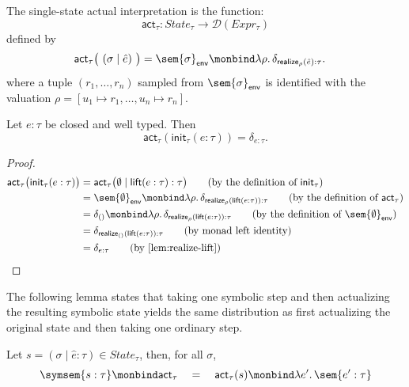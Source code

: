 \begin{definition}
  The single-state actual interpretation is the function:
  \[
    \mathsf{act}_\tau : State_\tau \to \mathcal{D}(Expr_\tau)
  \]
  defined by
  \[
  \begin{aligned}
    \mathsf{act}_\tau\big(\ (\sigma \mid \hat e)\ \big)
    &=
    \sem{\sigma}_{\mathsf{env}}
    \monbind
    \lambda\rho.\,
    \delta_{\mathsf{realize}_\rho(\hat e) : \tau}.
  \end{aligned}
  \]
  where a tuple $(r_1,\ldots,r_n)$ sampled from
  $\sem{\sigma}_{\mathsf{env}}$ is identified with the valuation
  $\rho=[u_1\mapsto r_1,\ldots,u_n\mapsto r_n]$.
\end{definition}


\begin{lemma}
  Let $e:\tau$ be closed and well typed. Then
  \[
    \mathsf{act}_\tau
    (\mathsf{init}_\tau(e : \tau))
    =
    \delta_{e:\tau}.
  \]
\end{lemma}

\begin{proof}
  \begin{align}
    \mathsf{act}_\tau
    \bigl(\mathsf{init}_\tau(e:\tau)\bigr)
    &=
    \mathsf{act}_\tau
    \bigl(\emptyset\mid\mathsf{lift}(e:\tau):\tau\bigr)
    \tag{by the definition of $\mathsf{init}_\tau$}
    \\
    &=
    \sem{\emptyset}_{\mathsf{env}}
    \monbind
    \lambda\rho.\,
    \delta_{\mathsf{realize}_\rho(\mathsf{lift}(e:\tau)):\tau}
    \tag{by the definition of $\mathsf{act}_\tau$}
    \\
    &=
    \delta_{()}
    \monbind
    \lambda\rho.\,
    \delta_{\mathsf{realize}_\rho(\mathsf{lift}(e:\tau)):\tau}
    \tag{by the definition of $\sem{\emptyset}_{\mathsf{env}}$}
    \\
    &=
    \delta_{\mathsf{realize}_{()}(\mathsf{lift}(e:\tau)):\tau}
    \tag{by monad left identity}
    \\
    &=
    \delta_{e:\tau}
    \tag{by~\Cref{lem:realize-lift}}
  \end{align}
\end{proof}

The following lemma states that taking one symbolic step and then actualizing the resulting symbolic state yields the same distribution as first actualizing the original state and then taking one ordinary step. 

\begin{lemma}\label{lem:symbolic-step}
  Let $s=(\sigma \mid \hat e : \tau) \in State_\tau$, then, for all $\sigma$,
  \begin{equation}
    \symsem{s : \tau}
    \monbind
    \mathsf{act}_\tau
    \quad 
    = 
    \quad
    \mathsf{act}_\tau(s)
    \monbind
    \lambda e'.\,\sem{e' : \tau}
  \end{equation}
\end{lemma}


